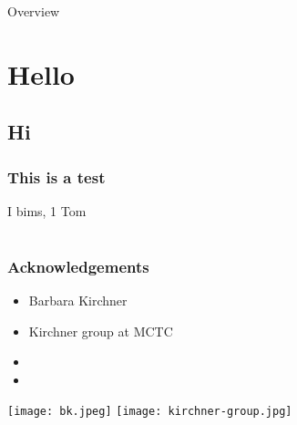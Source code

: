 \documentclass[t,
aspectratio=169,			%
]{beamer}
\begin{document}
\begin{frame}{Overview}
	\tableofcontents
\end{frame}

%   
\section{Hello}
\subsection{Hi}

\begin{frame}
	\frametitle{This is a test}

	I bims, 1 Tom
\end{frame}

\appendix
\section{}              %

\begin{frame}
	\frametitle{Acknowledgements}

	\begin{minipage}{.49\textwidth}
		\begin{itemize}
			\item Barbara Kirchner
			\item Kirchner group at MCTC
		\end{itemize}
	\end{minipage}
	\begin{minipage}{.49\textwidth}
		\begin{itemize}
			\item 
			\item 
		\end{itemize}
	\end{minipage}

	\begin{center}
		\texttt{[image: bk.jpeg]}
		\texttt{[image: kirchner-group.jpg]}
	\end{center}
\end{frame}
\end{document}
